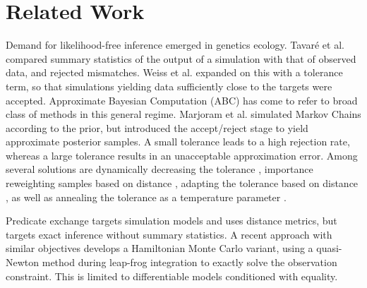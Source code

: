 \section{Related Work}

Demand for likelihood-free inference emerged in genetics ecology.
Tavar{\'e} et al.  compared summary statistics of the output of a simulation with that of observed data, and rejected mismatches.
Weiss et al.  expanded on this with a tolerance term, so that simulations yielding data sufficiently close to the targets were accepted.
Approximate Bayesian Computation (ABC) has come to refer to broad class of methods \cite{beaumont2002approximate,sisson2007sequential} in this general regime.
Marjoram et al.  simulated Markov Chains according to the prior, but introduced the accept/reject stage to yield approximate posterior samples.
A small tolerance leads to a high rejection rate, whereas a large tolerance results in an unacceptable approximation error.
Among several solutions are dynamically decreasing the tolerance \cite{toni2008approximate}, importance reweighting samples based on distance \cite{wegmann2009efficient}, adapting the tolerance based on distance \cite{del2012adaptive,lenormand2013adaptive}, as well as annealing the tolerance as a temperature parameter \cite{albert2015simulated}.

Predicate exchange targets simulation models and uses distance metrics, but targets exact inference without summary statistics.
A recent approach \cite{graham2017asymptotically}  with similar objectives develops a Hamiltonian Monte Carlo variant, using a quasi-Newton method during leap-frog integration to exactly solve the observation constraint.
This is limited to differentiable models conditioned with equality.


